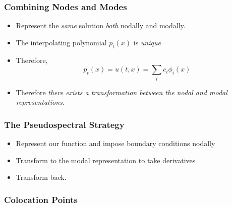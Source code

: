 \documentclass[]{beamer}
\newcommand{\myvec}[1]{\mathbf{#1}} %
\begin{document}
\begin{frame}
  \frametitle{Combining Nodes and Modes}
  \begin{itemize}
  \item Represent the \textit{same} solution \textit{both} nodally and
    modally.
    \pause
  \item The interpolating polynomial $p_t(x)$ is \textit{unique}
    \pause
  \item Therefore,
    $$p_t(x) = u(t,x) = \sum_{i}c_i \phi_i(x)$$
    \pause
  \item Therefore \textit{there exists a transformation between the
      nodal and modal representations.}
  \end{itemize}
\end{frame}

\begin{frame}
  \frametitle{The Pseudospectral Strategy}
  \begin{itemize}
    \item Represent our function and impose boundary conditions nodally 
    \item Transform to the modal representation to take derivatives
    \item Transform back.
  \end{itemize}
\end{frame}

\begin{frame}
  \frametitle{Colocation Points}
  
\end{frame}

\end{document}

